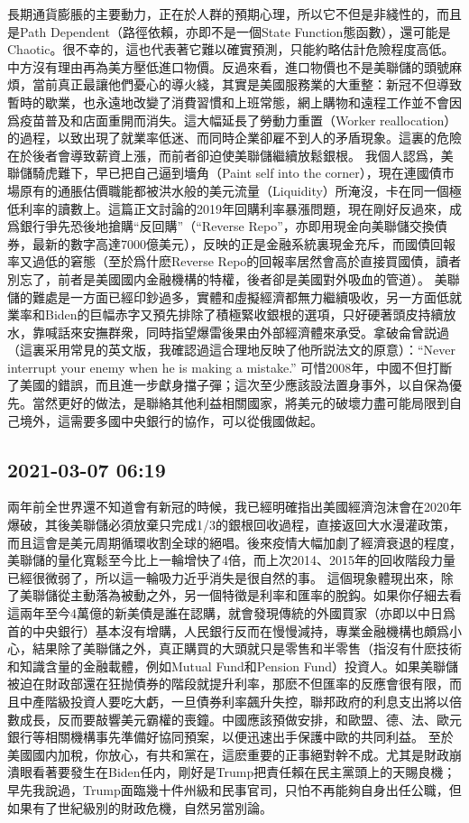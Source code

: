 \documentclass[twocolumn]{ctexart}
\begin{document}
長期通貨膨脹的主要動力，正在於人群的預期心理，所以它不但是非綫性的，而且是Path Dependent（路徑依賴，亦即不是一個State Function態函數），還可能是Chaotic。很不幸的，這也代表著它難以確實預測，只能約略估計危險程度高低。
中方沒有理由再為美方壓低進口物價。反過來看，進口物價也不是美聯儲的頭號麻煩，當前真正最讓他們憂心的導火綫，其實是美國服務業的大重整：新冠不但導致暫時的歇業，也永遠地改變了消費習慣和上班常態，網上購物和遠程工作並不會因爲疫苗普及和店面重開而消失。這大幅延長了勞動力重置（Worker reallocation）的過程，以致出現了就業率低迷、而同時企業卻雇不到人的矛盾現象。這裏的危險在於後者會導致薪資上漲，而前者卻迫使美聯儲繼續放鬆銀根。
我個人認爲，美聯儲騎虎難下，早已把自己逼到墻角（Paint self into the corner），現在連國債市場原有的通脹估價職能都被洪水般的美元流量（Liquidity）所淹沒，卡在同一個極低利率的讀數上。這篇正文討論的2019年回購利率暴漲問題，現在剛好反過來，成爲銀行爭先恐後地搶購“反回購”（“Reverse Repo”，亦即用現金向美聯儲交換債券，最新的數字高達7000億美元），反映的正是金融系統裏現金充斥，而國債回報率又過低的窘態（至於爲什麽Reverse Repo的回報率居然會高於直接買國債，讀者別忘了，前者是美國國内金融機構的特權，後者卻是美國對外吸血的管道）。
美聯儲的難處是一方面已經印鈔過多，實體和虛擬經濟都無力繼續吸收，另一方面低就業率和Biden的巨幅赤字又預先排除了積極緊收銀根的選項，只好硬著頭皮持續放水，靠喊話來安撫群衆，同時指望爆雷後果由外部經濟體來承受。拿破侖曾説過（這裏采用常見的英文版，我確認過這合理地反映了他所説法文的原意）：“Never interrupt your enemy when he is making a mistake.” 可惜2008年，中國不但打斷了美國的錯誤，而且進一步獻身擋子彈；這次至少應該設法置身事外，以自保為優先。當然更好的做法，是聯絡其他利益相關國家，將美元的破壞力盡可能局限到自己境外，這需要多國中央銀行的協作，可以從俄國做起。
\subsection*{2021-03-07 06:19}

兩年前全世界還不知道會有新冠的時候，我已經明確指出美國經濟泡沫會在2020年爆破，其後美聯儲必須放棄只完成1/3的銀根回收過程，直接返回大水漫灌政策，而且這會是美元周期循環收割全球的絕唱。後來疫情大幅加劇了經濟衰退的程度，美聯儲的量化寬鬆至今比上一輪增快了4倍，而上次2014、2015年的回收階段力量已經很微弱了，所以這一輪吸力近乎消失是很自然的事。
這個現象體現出來，除了美聯儲從主動落為被動之外，另一個特徵是利率和匯率的脫鈎。如果你仔細去看這兩年至今4萬億的新美債是誰在認購，就會發現傳統的外國買家（亦即以中日爲首的中央銀行）基本沒有增購，人民銀行反而在慢慢減持，專業金融機構也頗爲小心，結果除了美聯儲之外，真正購買的大頭就只是零售和半零售（指沒有什麽技術和知識含量的金融載體，例如Mutual Fund和Pension Fund）投資人。如果美聯儲被迫在財政部還在狂抛債券的階段就提升利率，那麽不但匯率的反應會很有限，而且中產階級投資人要吃大虧，一旦債券利率飆升失控，聯邦政府的利息支出將以倍數成長，反而要敲響美元霸權的喪鐘。中國應該預做安排，和歐盟、德、法、歐元銀行等相關機構事先準備好協同預案，以便迅速出手保護中歐的共同利益。
至於美國國内加稅，你放心，有共和黨在，這麽重要的正事絕對幹不成。尤其是財政崩潰眼看著要發生在Biden任内，剛好是Trump把責任賴在民主黨頭上的天賜良機；早先我說過，Trump面臨幾十件州級和民事官司，只怕不再能夠自身出任公職，但如果有了世紀級別的財政危機，自然另當別論。
\end{document}
